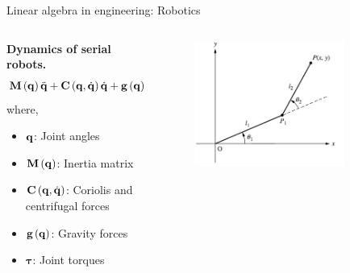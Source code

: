 \documentclass[aspectratio=169]{beamer}
\let\olditem\item
\renewcommand{\item}{\setlength{\itemsep}{\fill}\olditem}
\def\mf{\ensuremath\mathbf}
\def\lp{\ensuremath\left(}
\def\rp{\ensuremath\right)}
\newcommand{\ct}[1]{\lp #1\rp}
\begin{document}
\begin{frame}{Linear algebra in engineering: Robotics}
  \begin{columns}
    \begin{column}{0.5\textwidth}
      \textbf{Dynamics of serial robots.}
      \[ 
        \mf{M}\ct{\mf{q}} \ddot{\mf{q}} + \mf{C}\ct{\mf{q}, \dot{\mf{q}}} \dot{\mf{q}} + \mf{g}\ct{\mf{q}} = \bm{\tau} + \mf{J}^\top \mf{f}
      \]
      where,
      \begin{itemize}
        \item $\mf{q}$: Joint angles
        \item $\mf{M}\ct{\mf{q}}$: Inertia matrix
        \item $\mf{C}\ct{\mf{q}, \dot{\mf{q}}}$: Coriolis and centrifugal forces
        \item $\mf{g}\ct{\mf{q}}$: Gravity forces
        \item $\bm{\tau}$: Joint torques
      \end{itemize}
      
    \end{column}
    \begin{column}{0.45\textwidth}
      \begin{figure}
        \centering
        \includegraphics[width=0.8\textwidth]{2links.png}
      \end{figure}
    \end{column}    
  \end{columns}
\end{frame}
\end{document}
